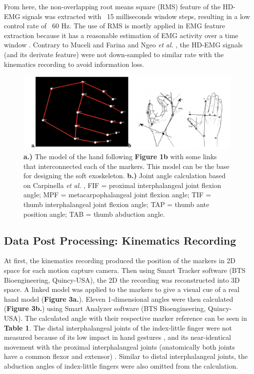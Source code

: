\documentclass[conference]{IEEEtran}
\begin{document}
From here, the non-overlapping root means square (RMS) feature of the HD-EMG signals was extracted 
with ~15 milliseconds window steps, resulting in a low control rate of ~60 Hz. The use of RMS is mostly 
applied in EMG feature extraction because it has a reasonable estimation of EMG activity over a time 
window \cite{b2}\cite{b30}. Contrary to Muceli and Farina \cite{b9} and Ngeo \textit{et al.} \cite{b16}, the HD-EMG signals (and its 
derivate feature) were not down-sampled to similar rate with the kinematics recording to avoid information 
loss.

\begin{figure}[htbp]
\centerline{\includegraphics[width=\textwidth]{figure3.png}}
\caption{ \textbf{a.)} The model of the hand following \textbf{Figure 1b} with some links that interconnected each of 
the markers. This model can be the base for designing the soft exoskeleton. \textbf{b.)} Joint angle calculation 
based on Carpinella \textit{et al.} \cite{b25}, FIF = proximal interphalangeal joint flexion angle; MPF = 
metacarpophalangeal joint flexion angle; TIF = thumb interphalangeal joint flexion angle; TAP = 
thumb ante position angle; TAB = thumb abduction angle.}
\label{figure3}
\end{figure}

\subsection{Data Post Processing: Kinematics Recording}
At first, the kinematics recording produced the position of the markers in 2D space for each  
motion capture camera. Then using Smart Tracker software (BTS Bioengineering, Quincy-USA), the 2D 
the recording was reconstructed into 3D space. A linked model was applied to the markers to give a visual cue 
of a real hand model (\textbf{Figure 3a.}). Eleven 1-dimensional angles were then calculated (\textbf{Figure 3b.}) using 
Smart Analyzer software (BTS Bioengineering, Quincy-USA). The calculated angle with their respective 
marker reference can be seen in \textbf{Table 1}. The distal interphalangeal joints of the index-little finger were not 
measured because of its low impact in hand gestures \cite{b31}, and its near-identical movement with the proximal 
interphalangeal joints (anatomically both joints have a common flexor and extensor) \cite{b16}. Similar to distal 
interphalangeal joints, the abduction angles of index-little fingers were also omitted from the calculation.
\end{document}
